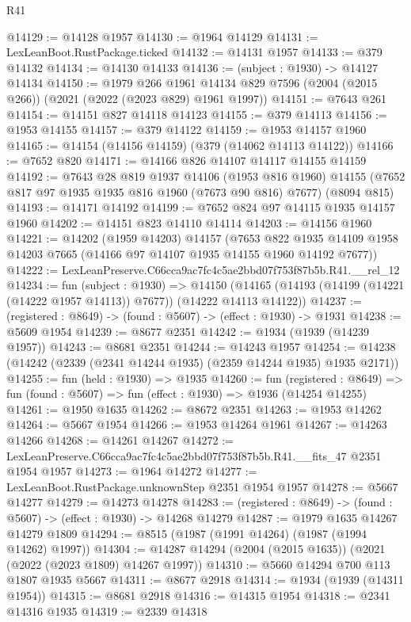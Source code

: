 \begin{lexlean}{R41}
\begin{coremodule}
@14129 := @14128 @1957
@14130 := @1964 @14129
@14131 := LexLeanBoot.RustPackage.ticked
@14132 := @14131 @1957
@14133 := @379 @14132
@14134 := @14130 @14133
@14136 := (subject : @1930) -> @14127 @14134
@14150 := @1979
    @266
    @1961
    @14134
    @829
    @7596
    (@2004 (@2015 @266))
    (@2021 (@2022 (@2023 @829) @1961 @1997))
@14151 := @7643 @261
@14154 := @14151 @827 @14118 @14123
@14155 := @379 @14113
@14156 := @1953 @14155
@14157 := @379 @14122
@14159 := @1953 @14157 @1960
@14165 := @14154 (@14156 @14159) (@379 (@14062 @14113 @14122))
@14166 := @7652 @820
@14171 := @14166 @826 @14107 @14117 @14155 @14159
@14192 := @7643
    @28
    @819
    @1937
    @14106
    (@1953 @816 @1960)
    @14155
    (@7652 @817 @97 @1935 @1935 @816 @1960 (@7673 @90 @816) @7677)
    (@8094 @815)
@14193 := @14171 @14192
@14199 := @7652 @824 @97 @14115 @1935 @14157 @1960
@14202 := @14151 @823 @14110 @14114
@14203 := @14156 @1960
@14221 := @14202
    (@1959 @14203)
    @14157
    (@7653 @822 @1935 @14109 @1958 @14203 @7665 (@14166 @97 @14107 @1935 @14155 @1960 @14192 @7677))
@14222 := LexLeanPreserve.C66cca9ac7fc4c5ae2bbd07f753f87b5b.R41.__rel_12
@14234 := fun (subject : @1930) =>
  @14150 (@14165 (@14193 (@14199 (@14221 (@14222 @1957 @14113)) @7677)) (@14222 @14113 @14122))
@14237 := (registered : @8649) -> (found : @5607) -> (effect : @1930) -> @1931
@14238 := @5609 @1954
@14239 := @8677 @2351
@14242 := @1934 (@1939 (@14239 @1957))
@14243 := @8681 @2351
@14244 := @14243 @1957
@14254 := @14238 (@14242 (@2339 (@2341 @14244 @1935) (@2359 @14244 @1935) @1935 @2171))
@14255 := fun (held : @1930) => @1935
@14260 := fun (registered : @8649) =>
  fun (found : @5607) => fun (effect : @1930) => @1936 (@14254 @14255)
@14261 := @1950 @1635
@14262 := @8672 @2351
@14263 := @1953 @14262
@14264 := @5667 @1954
@14266 := @1953 @14264 @1961
@14267 := @14263 @14266
@14268 := @14261 @14267
@14272 := LexLeanPreserve.C66cca9ac7fc4c5ae2bbd07f753f87b5b.R41.__fits_47 @2351 @1954 @1957
@14273 := @1964 @14272
@14277 := LexLeanBoot.RustPackage.unknownStep @2351 @1954 @1957
@14278 := @5667 @14277
@14279 := @14273 @14278
@14283 := (registered : @8649) -> (found : @5607) -> (effect : @1930) -> @14268 @14279
@14287 := @1979 @1635 @14267 @14279 @1809
@14294 := @8515 (@1987 (@1991 @14264) (@1987 (@1994 @14262) @1997))
@14304 := @14287 @14294 (@2004 (@2015 @1635)) (@2021 (@2022 (@2023 @1809) @14267 @1997))
@14310 := @5660 @14294 @700 @113 @1807 @1935 @5667
@14311 := @8677 @2918
@14314 := @1934 (@1939 (@14311 @1954))
@14315 := @8681 @2918
@14316 := @14315 @1954
@14318 := @2341 @14316 @1935
@14319 := @2339 @14318

\end{coremodule}
\end{lexlean}
